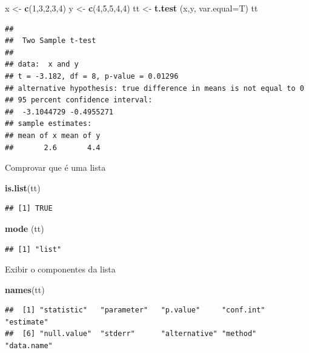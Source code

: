 \documentclass[]{book}
\newenvironment{Shaded}{\begin{snugshade}}{\end{snugshade}}
\newcommand{\DataTypeTok}[1]{\textcolor[rgb]{0.13,0.29,0.53}{#1}}
\newcommand{\DecValTok}[1]{\textcolor[rgb]{0.00,0.00,0.81}{#1}}
\newcommand{\KeywordTok}[1]{\textcolor[rgb]{0.13,0.29,0.53}{\textbf{#1}}}
\newcommand{\NormalTok}[1]{#1}
\newcommand{\StringTok}[1]{\textcolor[rgb]{0.31,0.60,0.02}{#1}}
\begin{document}
\begin{Shaded}
\begin{Highlighting}[]
\NormalTok{x <-}\StringTok{ }\KeywordTok{c}\NormalTok{(}\DecValTok{1}\NormalTok{,}\DecValTok{3}\NormalTok{,}\DecValTok{2}\NormalTok{,}\DecValTok{3}\NormalTok{,}\DecValTok{4}\NormalTok{)}
\NormalTok{y <-}\StringTok{ }\KeywordTok{c}\NormalTok{(}\DecValTok{4}\NormalTok{,}\DecValTok{5}\NormalTok{,}\DecValTok{5}\NormalTok{,}\DecValTok{4}\NormalTok{,}\DecValTok{4}\NormalTok{)}
\NormalTok{tt <-}\StringTok{ }\KeywordTok{t.test}\NormalTok{ (x,y, }\DataTypeTok{var.equal=}\NormalTok{T)}
\NormalTok{tt}
\end{Highlighting}
\end{Shaded}

\begin{verbatim}
## 
##  Two Sample t-test
## 
## data:  x and y
## t = -3.182, df = 8, p-value = 0.01296
## alternative hypothesis: true difference in means is not equal to 0
## 95 percent confidence interval:
##  -3.1044729 -0.4955271
## sample estimates:
## mean of x mean of y 
##       2.6       4.4
\end{verbatim}

Comprovar que é uma lista

\begin{Shaded}
\begin{Highlighting}[]
\KeywordTok{is.list}\NormalTok{(tt)}
\end{Highlighting}
\end{Shaded}

\begin{verbatim}
## [1] TRUE
\end{verbatim}

\begin{Shaded}
\begin{Highlighting}[]
\KeywordTok{mode}\NormalTok{ (tt)}
\end{Highlighting}
\end{Shaded}

\begin{verbatim}
## [1] "list"
\end{verbatim}

Exibir o componentes da lista

\begin{Shaded}
\begin{Highlighting}[]
\KeywordTok{names}\NormalTok{(tt)}
\end{Highlighting}
\end{Shaded}

\begin{verbatim}
##  [1] "statistic"   "parameter"   "p.value"     "conf.int"    "estimate"   
##  [6] "null.value"  "stderr"      "alternative" "method"      "data.name"
\end{verbatim}
\end{document}
